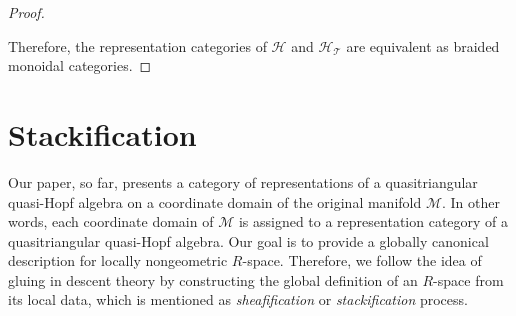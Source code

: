 \documentclass[reqno]{amsart}
\theoremstyle{definition}
\theoremstyle{remark}
\begin{document}
\begin{proof}
\begin{figure}[H]
\end{figure}
Therefore, the representation categories of $\mathscr{H}$ and $\mathscr{H}_\mathcal{T}$ are equivalent as braided monoidal categories.
\end{proof}





\section{Stackification}\label{sec:Stackification}
Our paper, so far, presents a category of representations of a quasitriangular quasi-Hopf algebra on a coordinate domain of the original manifold $\mathcal{M}$. In other words, each coordinate domain of $\mathcal{M}$ is assigned to a representation category of a quasitriangular quasi-Hopf algebra. Our goal is to provide a globally canonical description for locally nongeometric $R$-space. Therefore, we follow the idea of gluing in descent theory by constructing the global definition of an $R$-space from its local data, which is mentioned as \textit{sheafification} or \textit{stackification} process. 
\end{document}

